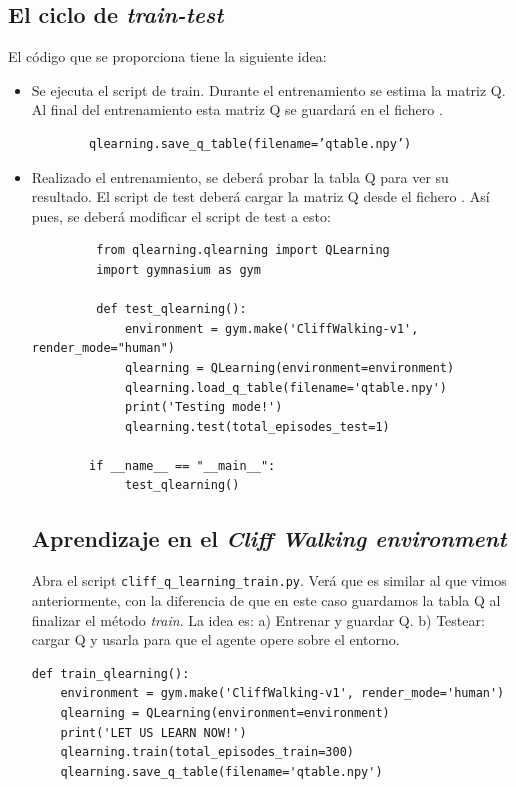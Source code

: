 \documentclass{article}
\begin{document}
\subsection{El ciclo de \textit{train-test}}
El código que se proporciona tiene la siguiente idea:
\begin{itemize}
    \item Se ejecuta el script de train. Durante el entrenamiento se estima la matriz Q. Al final del entrenamiento esta matriz Q se guardará en el fichero . 
    \begin{verbatim}
        qlearning.save_q_table(filename=’qtable.npy’)
    \end{verbatim}
     \item Realizado el entrenamiento, se deberá probar la tabla Q para ver su resultado. El script de test deberá cargar la matriz Q desde el fichero . Así pues, se deberá modificar el script de test a esto:
     \begin{verbatim}
         from qlearning.qlearning import QLearning
         import gymnasium as gym

         def test_qlearning():
             environment = gym.make('CliffWalking-v1', render_mode="human")
             qlearning = QLearning(environment=environment)
             qlearning.load_q_table(filename='qtable.npy')
             print('Testing mode!')
             qlearning.test(total_episodes_test=1)

        if __name__ == "__main__":
             test_qlearning()
     \end{verbatim}
    



\subsection{Aprendizaje en el \textit{Cliff Walking environment}}
Abra el script \texttt{cliff\_q\_learning\_train.py}. Verá que es similar al que vimos anteriormente, con la diferencia de que en este caso guardamos la tabla Q al finalizar el método \emph{train}. La idea es: a) Entrenar y guardar Q. b) Testear: cargar Q y usarla para que el agente opere sobre el entorno. 

\begin{verbatim}
def train_qlearning():    
    environment = gym.make('CliffWalking-v1', render_mode='human')
    qlearning = QLearning(environment=environment)
    print('LET US LEARN NOW!')
    qlearning.train(total_episodes_train=300)    
    qlearning.save_q_table(filename='qtable.npy')


\end{verbatim}
\end{itemize}
\end{document}
